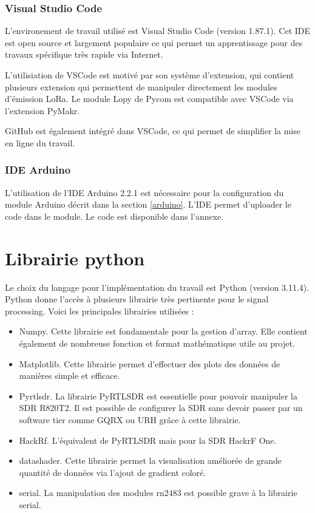 \subsubsection{Visual Studio Code}

L'environement de travail utilisé est Visual Studio Code (version 1.87.1). Cet IDE est open source et largement populaire ce qui permet un apprentissage pour des travaux spécifique très rapide via Internet. 

L'utilisiation de VSCode est motivé par son système d'extension, qui contient plusieurs extension qui permettent de manipuler directement les modules d'émission LoRa. Le module Lopy de Pycom est compatible avec VSCode via l'extension PyMakr.

GitHub est également intégré dans VSCode, ce qui permet de simplifier la mise en ligne du travail.

\subsubsection{IDE Arduino}

L'utilisation de l'IDE Arduino 2.2.1 est nécessaire pour la configuration du module Arduino décrit dans la section \ref{arduino}. L'IDE permet d'uploader le code  dans le module. Le code est disponible dans l'annexe.

\section{Librairie python}

Le choix du langage pour l'implémentation du travail est Python (version 3.11.4). Python donne l'accès à plusieurs librairie très pertinente pour le signal processing. Voici les principales librairies utilisées :

\begin{itemize}
\item Numpy. Cette librairie est fondamentale pour la gestion d'array. Elle contient également de nombreuse fonction et format mathématique utile au projet.
\item Matplotlib. Cette librairie permet d'effectuer des plots des données de manières simple et efficace.
\item Pyrtlsdr. La librairie PyRTLSDR est essentielle pour pouvoir manipuler la SDR R820T2. Il est possible de configurer la SDR sans devoir passer par un software tier comme GQRX ou URH grâce à cette librairie.
\item HackRf. L'équivalent de PyRTLSDR mais pour la SDR HackrF One.
\item datashader. Cette librairie permet la visualisation améliorée de grande quantité de données via l'ajout de gradient coloré.
\item serial. La manipulation des modules rn2483 est possible grave à la librairie serial.
\end{itemize}


